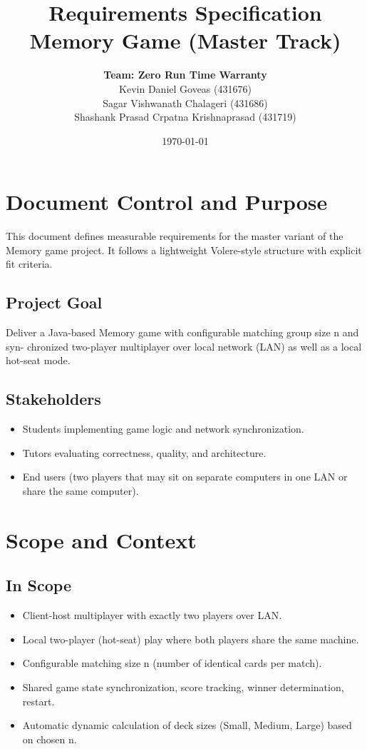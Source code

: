 \documentclass[a4paper,12pt]{article}
\title{Requirements Specification\\[0.5em]\large Memory Game (Master Track)}
\author{
    \textbf{Team: Zero Run Time Warranty} \\[1em]
    Kevin Daniel Goveas (431676) \\
    Sagar Vishwanath Chalageri (431686) \\
    Shashank Prasad Crpatna Krishnaprasad (431719)
}
\date{\today}
\begin{document}
    \maketitle
    \tableofcontents
    \newpage

    \section{Document Control and Purpose}
    This document defines measurable requirements for the master variant of the Memory
    game project. It follows a lightweight Volere-style structure with explicit fit criteria.

    \subsection{Project Goal}
    Deliver a Java-based Memory game with configurable matching group size n and syn-
    chronized two-player multiplayer over local network (LAN) as well as a local hot-seat mode.

    \subsection{Stakeholders}
    \begin{itemize}[itemsep=0pt,topsep=0pt,parsep=0pt,partopsep=0pt]
        \item Students implementing game logic and network synchronization.
        \item Tutors evaluating correctness, quality, and architecture.
        \item End users (two players that may sit on separate computers in one LAN or share the same computer).
    \end{itemize}

    \section{Scope and Context}

    \subsection{In Scope}
    \begin{itemize}[itemsep=0pt,topsep=0pt,parsep=0pt,partopsep=0pt]
        \item Client-host multiplayer with exactly two players over LAN.
        \item Local two-player (hot-seat) play where both players share the same machine.
        \item Configurable matching size n (number of identical cards per match).
        \item Shared game state synchronization, score tracking, winner determination, restart.
        \item Automatic dynamic calculation of deck sizes (Small, Medium, Large) based on chosen n.
    \end{itemize}
\end{document}
